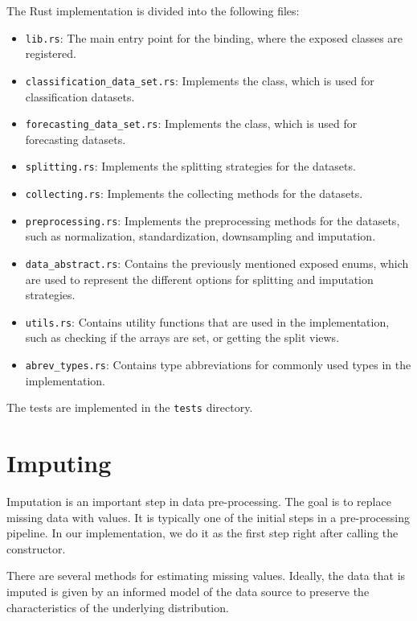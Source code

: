 \documentclass[review]{AIM_report}
\begin{document}
The Rust implementation is divided into the following files:
\begin{itemize}
    \item \texttt{lib.rs}: The main entry point for the binding, where the exposed classes are registered.
    \item \texttt{classification\_data\_set.rs}: Implements the \classificationDataSet class, which is used for classification datasets.
    \item \texttt{forecasting\_data\_set.rs}: Implements the \forecastingDataSet class, which is used for forecasting datasets.
    \item \texttt{splitting.rs}: Implements the splitting strategies for the datasets.
    \item \texttt{collecting.rs}: Implements the collecting methods for the datasets.
    \item \texttt{preprocessing.rs}: Implements the preprocessing methods for the datasets, such as normalization, standardization, downsampling and imputation.
    \item \texttt{data\_abstract.rs}: Contains the previously mentioned exposed enums, which are used to represent the different options for splitting and imputation strategies.
    \item \texttt{utils.rs}: Contains utility functions that are used in the implementation, such as checking if the arrays are set, or getting the split views.
    \item \texttt{abrev\_types.rs}: Contains type abbreviations for commonly used types in the implementation.
\end{itemize}

The tests are implemented in the \texttt{tests} directory.

\newpage
\section{Imputing}
\label{sec:imputing}

Imputation is an important step in data pre-processing. The goal is to replace missing data with values. It is typically one of the initial steps in a pre-processing pipeline. In our implementation, we do it as the first step right after calling the constructor.

There are several methods for estimating missing values. Ideally, the data that is imputed is given by an informed model of the data source to preserve the characteristics of the underlying distribution.
\end{document}

